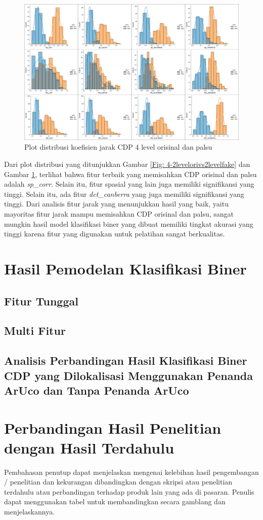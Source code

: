 \begin{figure}[!h]
	\centering
	\includegraphics[width=\textwidth]{contents/chapter-4/4-4levelorivs4levelfake.png}
	\caption{Plot distribusi koefisien jarak CDP 4 level orisinal dan palsu}
	\label{Fig: 4-4levelorivs4levelfake}
\end{figure}

Dari plot distribusi yang ditunjukkan Gambar \ref{Fig: 4-2levelorivs2levelfake} dan Gambar \ref{Fig: 4-4levelorivs4levelfake}, terlihat bahwa fitur terbaik yang memisahkan CDP orisinal dan palsu adalah \emph{sp\_corr}. Selain itu, fitur spasial yang lain juga memiliki signifikansi yang tinggi. Selain itu, ada fitur \emph{dct\_canberra} yang juga memiliki signifikansi yang tinggi. Dari analisis fitur jarak yang menunjukkan hasil yang baik, yaitu mayoritas fitur jarak mampu memisahkan CDP orisinal dan palsu, sangat mungkin hasil model klasifikasi biner yang dibuat memiliki tingkat akurasi yang tinggi karena fitur yang digunakan untuk pelatihan sangat berkualitas.

\section{Hasil Pemodelan Klasifikasi Biner}
\subsection{Fitur Tunggal}
\subsection{Multi Fitur}
\subsection{Analisis Perbandingan Hasil Klasifikasi Biner CDP yang Dilokalisasi Menggunakan Penanda ArUco dan Tanpa Penanda ArUco}

\section{Perbandingan Hasil Penelitian dengan Hasil Terdahulu}

Pembahasan penutup dapat menjelaskan mengenai kelebihan hasil pengembangan / penelitian dan kekurangan dibandingkan dengan skripsi atau penelitian terdahulu
atau perbandingan terhadap produk lain yang ada di pasaran. Penulis dapat menggunakan tabel untuk membandingkan secara gamblang dan menjelaskannya.